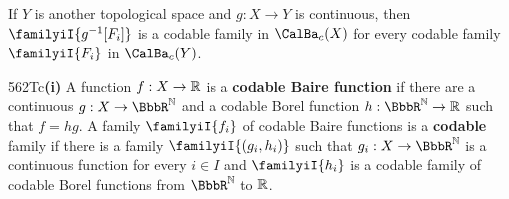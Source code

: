 \medskip

 If $Y$ is another topological space and
$g:X\to Y$ is continuous,
then $\familyiI{g^{-1}[F_i]}$ is a codable family
in $\CalBa_c(X)$ for every codable family $\familyiI{F_i}$ in
$\CalBa_c(Y)$.   

\spheader 562Tc{\bf (i)} 
A function $f:X\to\Bbb R$ is a {\bf codable Baire
function} if there are a continuous $g:X\to\BbbR^{\Bbb N}$ and a codable
Borel function $h:\BbbR^{\Bbb N}\to\Bbb R$ such that $f=hg$.
A family $\familyiI{f_i}$ of
codable Baire functions is a {\bf codable} family if there is a family
$\familyiI{(g_i,h_i)}$ such that $g_i:X\to\BbbR^{\Bbb N}$ is a continuous
function for every $i\in I$ and $\familyiI{h_i}$ is a codable family of
codable Borel functions from $\BbbR^{\Bbb N}$ to $\Bbb R$.

\medskip

